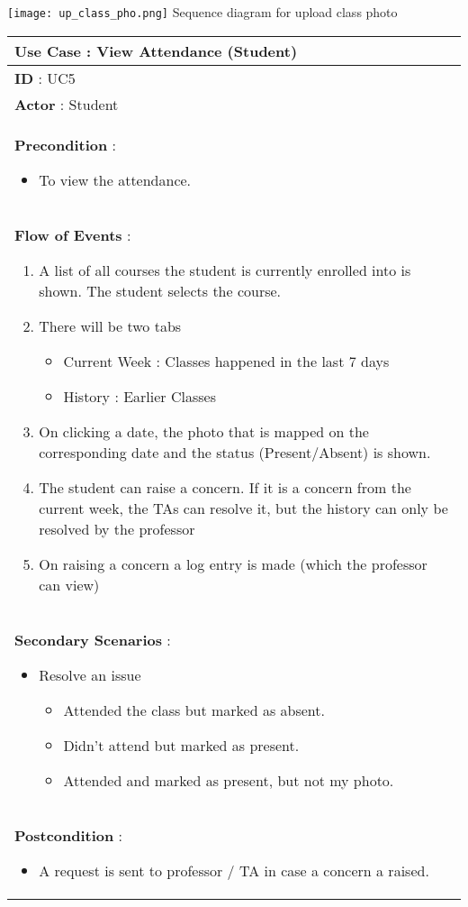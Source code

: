 \documentclass[paper=a4, fontsize=15pt]{scrartcl}
\begin{document}
 
  \begin{center}
\texttt{[image: up\_class\_pho.png]}
 {\Large Sequence diagram for upload class photo}
\end{center}



\begin{tabular}{|p{36em}|} 
 \hline
 \textbf{Use Case : View Attendance (Student)}\\
 \hline
 \textbf{ID } : UC5\\
 \hline
 \textbf{Actor }: Student\\
 \hline
 \textbf{Precondition }:
 \begin{itemize}[topsep=0pt]
     \item To view the attendance.
 \end{itemize}\\
 \hline
 \textbf{Flow of Events }:
 \begin{enumerate}[topsep=0pt]
     \item A list of all courses the student is currently enrolled into is shown. The student selects the course.
     \item There will be two tabs
     \begin{itemize}[topsep=0pt]
         \item  Current Week : Classes happened in the last 7 days
         \item  History : Earlier Classes
     \end{itemize} 
         
     \item On clicking a date, the photo that is mapped on the corresponding date and the status (Present/Absent) is shown.
     \item The student can raise a concern. If it is a concern from the current week, the TAs can resolve it, but the history can only be resolved by the professor
     \item On raising a concern a log entry is made (which the professor can view)
 \end{enumerate}\\
 \hline
 \textbf{Secondary Scenarios }:
 \begin{itemize}[topsep=0pt]
     \item Resolve an issue
     \begin{itemize}[topsep=0pt]
         \item Attended the class but marked as absent.
         \item Didn't attend but marked as present.
         \item Attended and marked as present, but not my photo.
     \end{itemize}       
 \end{itemize}\\
 \hline 
 \textbf{Postcondition }:
 \begin{itemize}[topsep=0pt]
     \item A request is sent to professor / TA in case a concern a raised.    
 \end{itemize}\\
 \hline
 
 
 \end{tabular}
 
\end{document}
